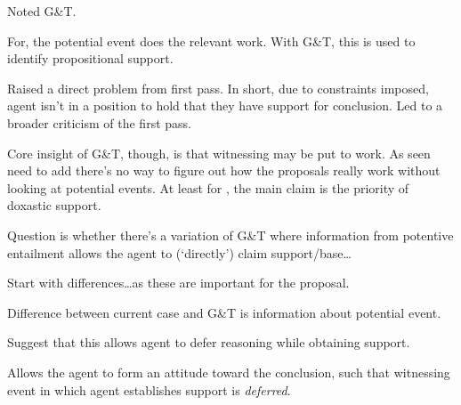 \begin{note}
  Noted G\&T.

  For, the potential event does the relevant work.
  With G\&T, this is used to identify propositional support.

  Raised a direct problem from first pass.
  In short, due to constraints imposed, agent isn't in a position to hold that they have support for conclusion.
  Led to a broader criticism of the first pass.

  Core insight of G\&T, though, is that witnessing may be put to work.
  As seen {\color{red} need to add} there's no way to figure out how the proposals really work without looking at potential events.
  At least for \citeauthor{Turri:2010aa}, the main claim is the priority of doxastic support.

  Question is whether there's a variation of G\&T where information from potentive entailment allows the agent to (`directly') claim support/base\dots
\end{note}

\begin{note}[Difference to G\&T]
  Start with differences\dots as these are important for the proposal.

  Difference between current case and G\&T is information about potential event.

  Suggest that this allows agent to defer reasoning while obtaining support.

  Allows the agent to form an attitude toward the conclusion, such that witnessing event in which agent establishes support is \emph{deferred}.
\end{note}

